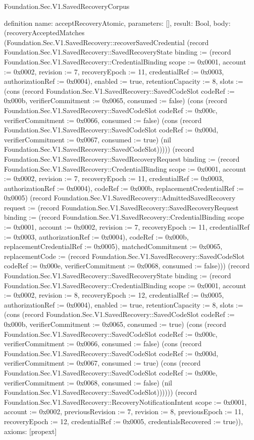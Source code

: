 \begin{lexlean}{Foundation.Sec.V1.SavedRecoveryCorpus}
\begin{semanticmodule}
definition{
  name: acceptRecoveryAtomic,
  parameters: [],
  result: Bool,
  body: (recoveryAcceptedMatches (Foundation.Sec.V1.SavedRecovery::recoverSavedCredential (record Foundation.Sec.V1.SavedRecovery::SavedRecoveryState {binding := (record Foundation.Sec.V1.SavedRecovery::CredentialBinding {scope := 0x0001, account := 0x0002, revision := 7, recoveryEpoch := 11, credentialRef := 0x0003, authorizationRef := 0x0004}), enabled := true, retentionCapacity := 8, slots := (cons (record Foundation.Sec.V1.SavedRecovery::SavedCodeSlot {codeRef := 0x000b, verifierCommitment := 0x0065, consumed := false}) (cons (record Foundation.Sec.V1.SavedRecovery::SavedCodeSlot {codeRef := 0x000c, verifierCommitment := 0x0066, consumed := false}) (cons (record Foundation.Sec.V1.SavedRecovery::SavedCodeSlot {codeRef := 0x000d, verifierCommitment := 0x0067, consumed := true}) (nil Foundation.Sec.V1.SavedRecovery::SavedCodeSlot))))}) (record Foundation.Sec.V1.SavedRecovery::SavedRecoveryRequest {binding := (record Foundation.Sec.V1.SavedRecovery::CredentialBinding {scope := 0x0001, account := 0x0002, revision := 7, recoveryEpoch := 11, credentialRef := 0x0003, authorizationRef := 0x0004}), codeRef := 0x000b, replacementCredentialRef := 0x0005}) (record Foundation.Sec.V1.SavedRecovery::AdmittedSavedRecovery {request := (record Foundation.Sec.V1.SavedRecovery::SavedRecoveryRequest {binding := (record Foundation.Sec.V1.SavedRecovery::CredentialBinding {scope := 0x0001, account := 0x0002, revision := 7, recoveryEpoch := 11, credentialRef := 0x0003, authorizationRef := 0x0004}), codeRef := 0x000b, replacementCredentialRef := 0x0005}), matchedCommitment := 0x0065, replacementCode := (record Foundation.Sec.V1.SavedRecovery::SavedCodeSlot {codeRef := 0x000e, verifierCommitment := 0x0068, consumed := false})})) (record Foundation.Sec.V1.SavedRecovery::SavedRecoveryState {binding := (record Foundation.Sec.V1.SavedRecovery::CredentialBinding {scope := 0x0001, account := 0x0002, revision := 8, recoveryEpoch := 12, credentialRef := 0x0005, authorizationRef := 0x0004}), enabled := true, retentionCapacity := 8, slots := (cons (record Foundation.Sec.V1.SavedRecovery::SavedCodeSlot {codeRef := 0x000b, verifierCommitment := 0x0065, consumed := true}) (cons (record Foundation.Sec.V1.SavedRecovery::SavedCodeSlot {codeRef := 0x000c, verifierCommitment := 0x0066, consumed := false}) (cons (record Foundation.Sec.V1.SavedRecovery::SavedCodeSlot {codeRef := 0x000d, verifierCommitment := 0x0067, consumed := true}) (cons (record Foundation.Sec.V1.SavedRecovery::SavedCodeSlot {codeRef := 0x000e, verifierCommitment := 0x0068, consumed := false}) (nil Foundation.Sec.V1.SavedRecovery::SavedCodeSlot)))))}) (record Foundation.Sec.V1.SavedRecovery::RecoveryNotificationIntent {scope := 0x0001, account := 0x0002, previousRevision := 7, revision := 8, previousEpoch := 11, recoveryEpoch := 12, credentialRef := 0x0005, credentialsRecovered := true})),
  axioms: [propext]
}


\end{semanticmodule}
\end{lexlean}

